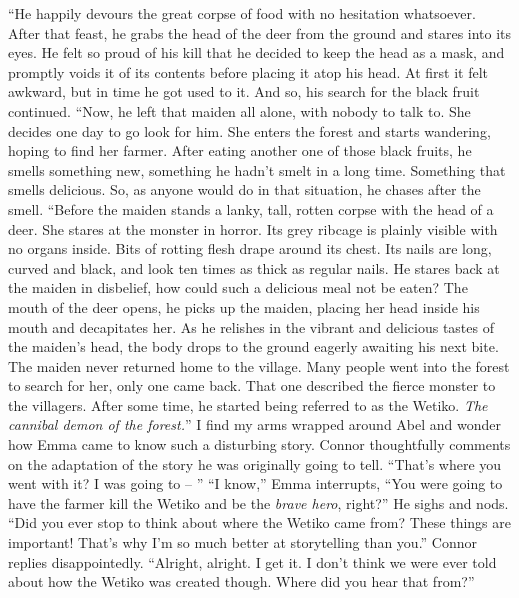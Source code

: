 \documentclass[openany, 12pt]{book}
\newcommand\tab[1][1cm]{\hspace*{#1}}
\begin{document}
\newline
\tab
``He happily devours the great corpse of food with no hesitation whatsoever. After that feast, he grabs the head of the deer from the ground and stares into its eyes. He felt so proud of his kill that he decided to keep the head as a mask, and promptly voids it of its contents before placing it atop his head. At first it felt awkward, but in time he got used to it. And so, his search for the black fruit continued.
\newline
\tab
``Now, he left that maiden all alone, with nobody to talk to. She decides one day to go look for him. She enters the forest and starts wandering, hoping to find her farmer. After eating another one of those black fruits, he smells something new, something he hadn’t smelt in a long time. Something that smells delicious. So, as anyone would do in that situation, he chases after the smell.
\newline
\tab
``Before the maiden stands a lanky, tall, rotten corpse with the head of a deer. She stares at the monster in horror. Its grey ribcage is plainly visible with no organs inside. Bits of rotting flesh drape around its chest. Its nails are long, curved and black, and look ten times as thick as regular nails. He stares back at the maiden in disbelief, how could such a delicious meal not be eaten? The mouth of the deer opens, he picks up the maiden, placing her head inside his mouth and decapitates her. As he relishes in the vibrant and delicious tastes of the maiden’s head, the body drops to the ground eagerly awaiting his next bite.  The maiden never returned home to the village. Many people went into the forest to search for her, only one came back. That one described the fierce monster to the villagers. After some time, he started being referred to as the Wetiko. \textit{The cannibal demon of the forest.}''
\newline
\tab
I find my arms wrapped around Abel and wonder how Emma came to know such a disturbing story. Connor thoughtfully comments on the adaptation of the story he was originally going to tell. ``That’s where you went with it? I was going to -- ''
\newline
\tab
``I know,'' Emma interrupts, ``You were going to have the farmer kill the Wetiko and be the \textit{brave hero}, right?'' He sighs and nods. ``Did you ever stop to think about where the Wetiko came from? These things are important! That’s why I’m so much better at storytelling than you.''
\newline
\tab
Connor replies disappointedly. ``Alright, alright. I get it. I don’t think we were ever told about how the Wetiko was created though. Where did you hear that from?''
\end{document}

